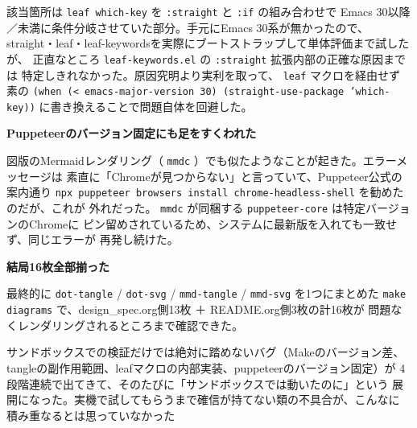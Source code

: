 \documentclass[11pt]{article}
\begin{document}
該当箇所は \texttt{leaf which-key} を \texttt{:straight} と \texttt{:if} の組み合わせで
Emacs 30以降／未満に条件分岐させていた部分。手元にEmacs 30系が無かったので、
straight・leaf・leaf-keywordsを実際にブートストラップして単体評価まで試したが、
正直なところ \texttt{leaf-keywords.el} の \texttt{:straight} 拡張内部の正確な原因までは
特定しきれなかった。原因究明より実利を取って、 \texttt{leaf} マクロを経由せず
素の \texttt{(when (< emacs-major-version 30) (straight-use-package 'which-key))}
に書き換えることで問題自体を回避した。

\textbf{Puppeteerのバージョン固定にも足をすくわれた}

図版のMermaidレンダリング（ \texttt{mmdc} ）でも似たようなことが起きた。エラーメッセージは
素直に「Chromeが見つからない」と言っていて、Puppeteer公式の案内通り
\texttt{npx puppeteer browsers install chrome-headless-shell} を勧めたのだが、これが
外れだった。 \texttt{mmdc} が同梱する \texttt{puppeteer-core} は特定バージョンのChromeに
ピン留めされているため、システムに最新版を入れても一致せず、同じエラーが
再発し続けた。

\textbf{結局16枚全部揃った}

最終的に \texttt{dot-tangle} / \texttt{dot-svg} / \texttt{mmd-tangle} / \texttt{mmd-svg} を1つにまとめた
\texttt{make diagrams} で、design\_spec.org側13枚 ＋ README.org側3枚の計16枚が
問題なくレンダリングされるところまで確認できた。

サンドボックスでの検証だけでは絶対に踏めないバグ（Makeのバージョン差、
tangleの副作用範囲、leafマクロの内部実装、puppeteerのバージョン固定）が
4段階連続で出てきて、そのたびに「サンドボックスでは動いたのに」という
展開になった。実機で試してもらうまで確信が持てない類の不具合が、こんなに
積み重なるとは思っていなかった
\end{document}
